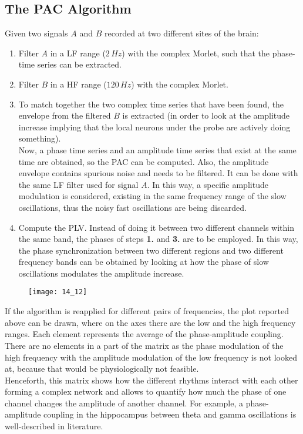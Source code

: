\subsection{The PAC Algorithm}
Given two signals \(A\) and \(B\) recorded at two different sites of the brain:
\begin{enumerate}
    \item Filter \(A\) in a LF range (\(2\,Hz\)) with the complex Morlet, such that the phase-time
          series can be extracted.
    \item Filter \(B\) in a HF range (\(120\,Hz\)) with the complex Morlet.
    \item To match together the two complex time series that have been found, the envelope from the
          filtered \(B\) is extracted (in order to look at the amplitude increase implying that the local
          neurons under the probe are actively doing something).\\
          Now, a phase time series and an amplitude time series that exist at the same time are obtained,
          so the PAC can be computed. Also, the amplitude envelope contains spurious noise and needs to
          be filtered. It can be done with the same LF filter used for signal \(A\). In this way,
          a specific amplitude modulation is considered, existing in the same frequency range of the
          slow oscillations, thus the noisy fast oscillations are being discarded.
    \item Compute the PLV. Instead of doing it between two different channels within the same band,
          the phases of steps \textbf{1.} and \textbf{3.} are to be employed. In this way, the phase
          synchronization between two different regions and two different frequency bands can be obtained
          by looking at how the phase of slow oscillations modulates the amplitude increase.
\end{enumerate}
\begin{figure}[H]
    \centering
    \texttt{[image: 14\_12]}
\end{figure}
If the algorithm is reapplied for different pairs of frequencies, the plot reported above can be drawn,
where on the axes there are the low and the high frequency ranges. Each element represents the average
of the phase-amplitude coupling. There are no elements in a part of the matrix as the phase modulation
of the high frequency with the amplitude modulation of the low frequency is not looked at, because that
would be physiologically not feasible.\\
Henceforth, this matrix shows how the different rhythms interact with each other forming a complex
network and allows to quantify how much the phase of one channel changes the amplitude of another
channel. For example, a phase-amplitude coupling in the hippocampus between theta and gamma oscillations
is well-described in literature.\\
